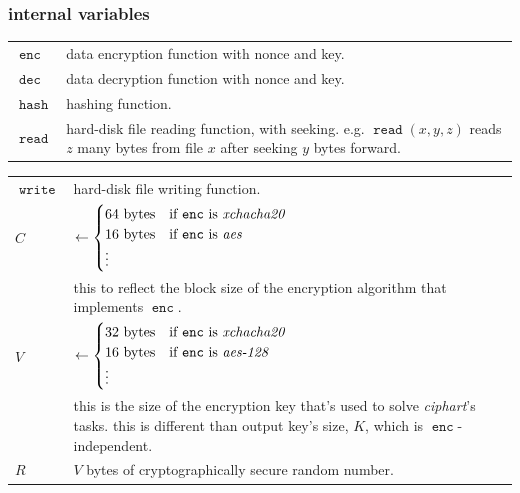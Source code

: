 \documentclass[twocolumn]{article}
\DeclareMathOperator{\fread}{\mathtt{read}}
\DeclareMathOperator{\fwrite}{\mathtt{write}}
\DeclareMathOperator{\enc}{\mathtt{enc}}
\DeclareMathOperator{\dec}{\mathtt{dec}}
\DeclareMathOperator{\hash}{\mathtt{hash}}
\begin{document}
\subsubsection{internal variables}
\begin{tabularx}{\columnwidth}{lX}
    $\enc$      & data encryption function with nonce and key.\\
    $\dec$      & data decryption function with nonce and key.\\
    $\hash$     & hashing function.\\
    $\fread$    & hard-disk file reading function, with seeking.  e.g.
                    $\fread(x, y, z)$ reads $z$ many bytes from file $x$
                    after seeking $y$ bytes forward.\\
\end{tabularx}
\begin{tabularx}{\columnwidth}{lX}
    $\fwrite$   & hard-disk file writing function.\\
    $C$         & $\gets \begin{cases}
                        64 \text{ bytes} & \text{if $\enc$ is
                                            \emph{xchacha20}}\\
                        16 \text{ bytes} & \text{if $\enc$ is \emph{aes}}\\
                        \vdots & \\
                     \end{cases}$\\
                & this to reflect the block size of the encryption
                    algorithm that implements $\enc$.\\
    $V$ & $\gets \begin{cases}
                        32 \text{ bytes} & \text{if $\enc$ is
                                            \emph{xchacha20}}\\
                        16 \text{ bytes} & \text{if $\enc$ is
                            \emph{aes-128}}\\
                        \vdots & \\
                     \end{cases}$\\
                & this is the size of the encryption key that's used to
                    solve \emph{ciphart}'s tasks.  this is different than
                    output key's size, $K$, which is $\enc$-independent.\\
    $R$         & $V$ bytes of cryptographically secure random number.

\end{tabularx}
\end{document}
